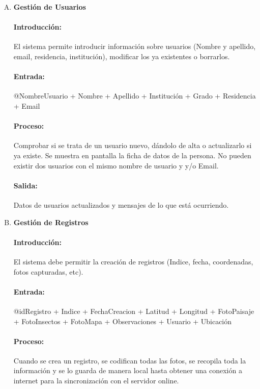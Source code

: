         \begin{enumerate}[A.]

        \item \textbf{Gestión de Usuarios}
        
        \paragraph{Introducción:} El sistema permite introducir información sobre usuarios (Nombre y apellido, email, residencia, institución), modificar los ya existentes o borrarlos.
        
        \paragraph{Entrada:} @NombreUsuario + Nombre + Apellido + Institución + Grado + Residencia + Email
        
        \paragraph{Proceso:} Comprobar si se trata de un usuario nuevo, dándolo de alta o actualizarlo si ya existe.
        Se muestra en pantalla la ficha de datos de la persona. No pueden existir dos usuarios con el mismo nombre de usuario y y/o Email. 
        
        \paragraph{Salida:}  Datos de usuarios actualizados y mensajes de lo que está ocurriendo.
        
        \item \textbf{Gestión de Registros}
        
        \paragraph{Introducción:}El sistema debe permitir la  creación de registros (Indice, fecha, coordenadas, fotos capturadas, etc). 
        
        \paragraph{Entrada:} @idRegistro + Indice + FechaCreacion + Latitud + Longitud + FotoPaisaje + FotoInsectos + FotoMapa + Observaciones + Usuario + Ubicación 
        
        \paragraph{Proceso:} Cuando se crea un registro, se codifican todas las fotos, se recopila toda la información y se lo guarda de manera local hasta obtener una conexión a internet para la sincronización con el servidor online.


\end{enumerate}
